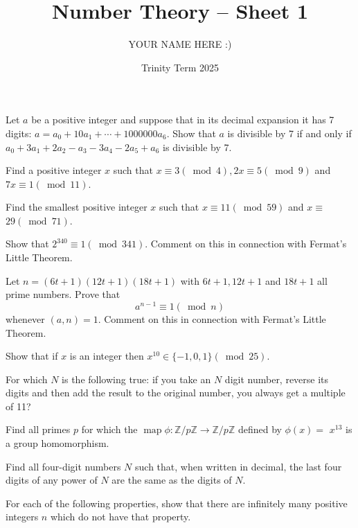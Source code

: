 \documentclass[answers]{exam}
\title{Number Theory -- Sheet 1}
\author{YOUR NAME HERE :)}
\date{Trinity Term 2025}
\begin{document}
\maketitle
\begin{questions}

\question%
Let $a$ be a positive integer and suppose that in its decimal expansion it has 7 digits: $a=a_0+10 a_1+\cdots+1000000 a_6$. Show that $a$ is divisible by 7 if and only if $a_0+3 a_1+2 a_2-a_3-3 a_4-2 a_5+a_6$ is divisible by 7.



\question%
Find a positive integer $x$ such that $x \equiv 3(\bmod 4), 2 x \equiv 5(\bmod 9)$ and $7 x \equiv 1(\bmod 11)$.



\question%
Find the smallest positive integer $x$ such that $x \equiv 11(\bmod 59)$ and $x \equiv$ $29(\bmod 71)$.



\question%
Show that $2^{340} \equiv 1(\bmod 341)$. Comment on this in connection with Fermat's Little Theorem.



\question%
Let $n=(6 t+1)(12 t+1)(18 t+1)$ with $6 t+1,12 t+1$ and $18 t+1$ all prime numbers. Prove that \[
	a^{n-1} \equiv 1(\bmod n)
\] whenever $(a, n)=1$. Comment on this in connection with Fermat's Little Theorem.


\question%
Show that if $x$ is an integer then $x^{10} \in\{-1,0,1\}(\bmod 25)$.



\question%
For which $N$ is the following true: if you take an $N$ digit number, reverse its digits and then add the result to the original number, you always get a multiple of 11?



\question%
Find all primes $p$ for which the $\operatorname{map} \phi: \mathbb{Z} / p \mathbb{Z} \to \mathbb{Z} / p \mathbb{Z}$ defined by $\phi(x)=$ $x^{13}$ is a group homomorphism.



\question%
Find all four-digit numbers $N$ such that, when written in decimal, the last four digits of any power of $N$ are the same as the digits of $N$.



\question%
For each of the following properties, show that there are infinitely many positive integers $n$ which do not have that property.
\end{questions}
\end{document}
